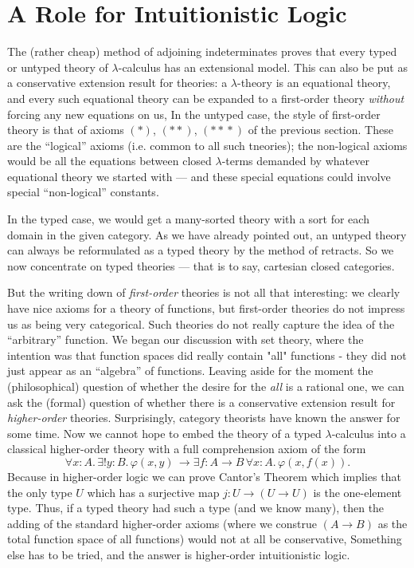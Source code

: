 \documentclass[12pt]{article}
\def\to{\rightarrow}
\def\ffam{\varphi}
\def\l{\lambda}
\def\sss{(*\!*\!*)}
\def\ss{(**)}
\begin{document}
\section{A Role for Intuitionistic Logic}

The (rather cheap) method of adjoining indeterminates proves that every typed or untyped theory of $\l$-calculus has an extensional model. This can also be put as a conservative extension result for theories: a $\l$-theory is an equational theory, and every such equational theory can be expanded to a first-order theory {\it without} forcing any new equations on us,  In the untyped case, the style of first-order theory is that of axioms $(*)$, $\ss$, $\sss$ of the previous section. These are the ``logical'' axioms (i.e. common to all such tneories); the non-logical axioms would be all the equations between closed $\l$-terms demanded by whatever equational theory we started with --- and these special equations could involve special ``non-logical'' constants.

In the typed case, we would get a many-sorted theory with a sort for each domain in the given category. As we have already pointed out, an untyped theory can always be reformulated as a typed theory by the method of retracts. So we now concentrate on typed theories --- that is to say, cartesian closed categories.

But the writing down of {\it first-order} theories is not all that interesting: we clearly have nice axioms for a theory of functions, but first-order theories do not impress us as being very categorical. Such theories do not really capture the idea of the ``arbitrary'' function. We began our discussion with set theory, where the intention was that function spaces did really contain "all" functions - they did not just appear as an ``algebra'' of functions. Leaving aside for the moment the (philosophical) question of whether the desire for the {\it all} is a rational one, we can ask the (formal) question of whether there is a conservative extension result for {\it higher-order} theories. Surprisingly, category theorists have known the answer for some time.
Now we cannot hope to embed the theory of a typed $\l$-calculus into a classical higher-order theory with a full comprehension axiom of the form
$$
\forall x:A .\,	\exists !y: B .\,  \ffam(x,y)  \, \to  \exists f: A\to B \, \forall x: A .\, \ffam(x,f(x)).
$$
Because in higher-order logic we can prove Cantor's Theorem which implies that the only type $U$ which has a surjective map
$j : U \to	(U\to U)$ is the one-element type. Thus, if a typed theory had such a type (and we know many), then the adding of the
standard higher-order axioms (where we construe $(A\to B)$ as the total function space of all functions) would not at all be conservative, Something else has to be tried, and the answer is higher-order intuitionistic logic.
\end{document}
